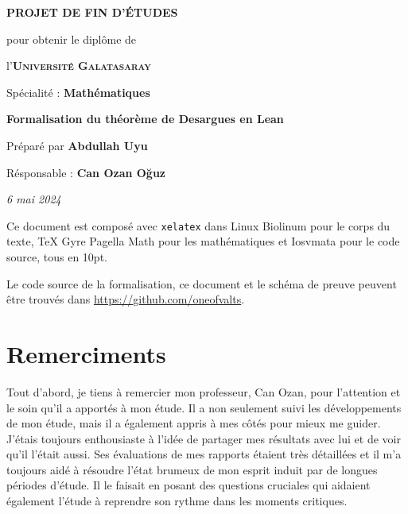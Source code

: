 \documentclass[10pt]{memoir}
\makeatletter
\newcommand\iraggedright{%
  \let\\\@centercr\@rightskip\@flushglue \rightskip\@rightskip
  \leftskip\z@skip}
\theoremstyle{definition}
\theoremstyle{remark}
\makeatother
\begin{document}
\frontmatter
\thispagestyle{empty}
\begin{center}
  \vspace*{\fill}
  

  \vspace{1cm}
  \large{\textbf{PROJET DE FIN D'ÉTUDES}}

  \vspace{0.5cm}
  {\small pour obtenir le diplôme de}

  \vspace{0.5cm}
  l'\textsc{\textbf{Université Galatasaray}}

  {\small Spécialité : \textbf{Mathématiques}}

  \vspace{2.25cm}
  {\Large\textbf{Formalisation du théorème de Desargues en Lean}}

  \vspace{1.25cm}
  Préparé par \textbf{Abdullah Uyu}

  Résponsable : \textbf{Can Ozan Oğuz}

  \vspace{2.25cm}
  \textit{6 mai 2024}
  \vspace*{\fill}
\end{center}
\iraggedright
\clearpage
\null{}
\vfill{}
Ce document est composé avec \texttt{xelatex} dans Linux Biolinum pour le
corps du texte, TeX Gyre Pagella Math pour les mathématiques et Iosvmata
pour le code source, tous en 10pt.

Le code source de la formalisation, ce document et le schéma de preuve
peuvent être trouvés dans \url{https://github.com/oneofvalts}.
\chapter*{Remerciments}
Tout d'abord, je tiens à remercier mon professeur, Can Ozan, pour
l'attention et le soin qu'il a apportés à mon étude. Il a non seulement
suivi les développements de mon étude, mais il a également appris à mes
côtés pour mieux me guider. J'étais toujours enthousiaste à l'idée de
partager mes résultats avec lui et de voir qu'il l'était aussi. Ses
évaluations de mes rapports étaient très détaillées et il m'a toujours
aidé à résoudre l'état brumeux de mon esprit induit par de longues
périodes d'étude. Il le faisait en posant des questions cruciales qui
aidaient également l'étude à reprendre son rythme dans les moments
critiques.
\end{document}
